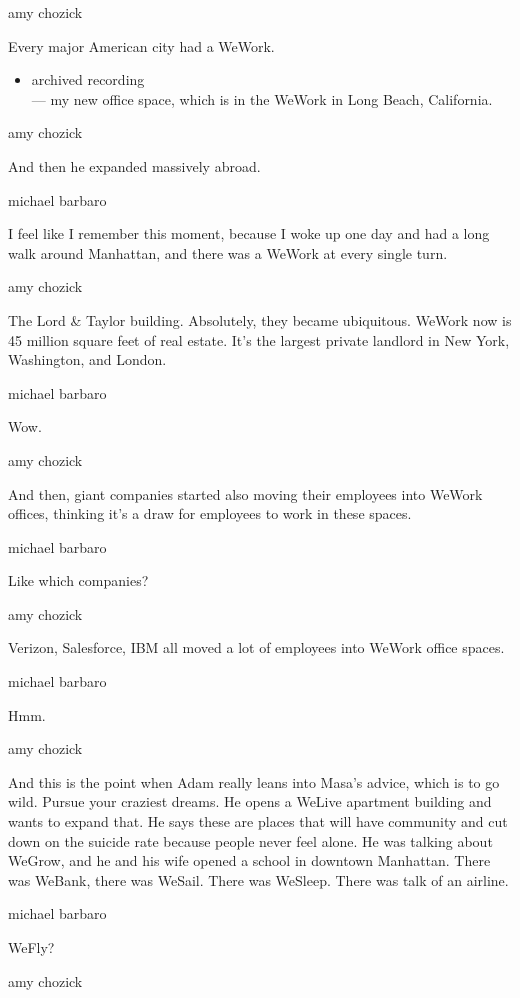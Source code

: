 amy chozick

Every major American city had a WeWork.

\begin{itemize}
\tightlist
\item
  archived recording\\
  --- my new office space, which is in the WeWork in Long Beach,
  California.
\end{itemize}

amy chozick

And then he expanded massively abroad.

michael barbaro

I feel like I remember this moment, because I woke up one day and had a
long walk around Manhattan, and there was a WeWork at every single turn.

amy chozick

The Lord \& Taylor building. Absolutely, they became ubiquitous. WeWork
now is 45 million square feet of real estate. It's the largest private
landlord in New York, Washington, and London.

michael barbaro

Wow.

amy chozick

And then, giant companies started also moving their employees into
WeWork offices, thinking it's a draw for employees to work in these
spaces.

michael barbaro

Like which companies?

amy chozick

Verizon, Salesforce, IBM all moved a lot of employees into WeWork office
spaces.

michael barbaro

Hmm.

amy chozick

And this is the point when Adam really leans into Masa's advice, which
is to go wild. Pursue your craziest dreams. He opens a WeLive apartment
building and wants to expand that. He says these are places that will
have community and cut down on the suicide rate because people never
feel alone. He was talking about WeGrow, and he and his wife opened a
school in downtown Manhattan. There was WeBank, there was WeSail. There
was WeSleep. There was talk of an airline.

michael barbaro

WeFly?

amy chozick

